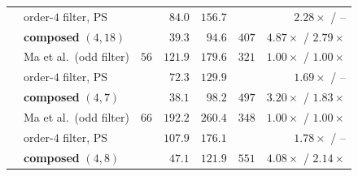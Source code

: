 \begin{table}[t]
\begin{tabular}{@{}llrrrrr@{}}
 & order-$4$ filter, PS & & $84.0$ & $156.7$ & & $2.28\times$ / --\\
 & \textbf{composed} $(4,18)$ & & $\mathbf{39.3}$ & $\mathbf{94.6}$ & $407$ & $\mathbf{4.87\times}$ / $\mathbf{2.79\times}$\\
\midrule
{} & Ma et al.\ (odd filter) & $56$ & $121.9$ & $179.6$ & $321$ & $1.00\times$ / $1.00\times$\\
 & order-$4$ filter, PS & & $72.3$ & $129.9$ & & $1.69\times$ / --\\
 & \textbf{composed} $(4,7)$ & & $\mathbf{38.1}$ & $\mathbf{98.2}$ & $497$ & $\mathbf{3.20\times}$ / $\mathbf{1.83\times}$\\
\midrule
{} & Ma et al.\ (odd filter) & $66$ & $192.2$ & $260.4$ & $348$ & $1.00\times$ / $1.00\times$\\
 & order-$4$ filter, PS & & $107.9$ & $176.1$ & & $1.78\times$ / --\\
 & \textbf{composed} $(4,8)$ & & $\mathbf{47.1}$ & $\mathbf{121.9}$ & $551$ & $\mathbf{4.08\times}$ / $\mathbf{2.14\times}$\\
\bottomrule\end{tabular}\end{table}
